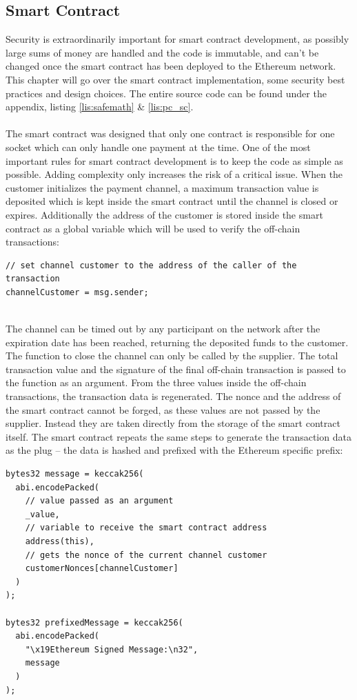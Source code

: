 \subsection{Smart Contract}
Security is extraordinarily important for smart contract development, as possibly large sums of money are handled and the code is immutable, and can’t be changed once the smart contract has been deployed to the Ethereum network.
This chapter will go over the smart contract implementation, some security best practices and design choices.
The entire source code can be found under the appendix, listing \ref{lis:safemath} \& \ref{lis:pc_sc}.
\\\\
The smart contract was designed that only one contract is responsible for one socket which can only handle one payment at the time.
One of the most important rules for smart contract development is to keep the code as simple as possible.
Adding complexity only increases the risk of a critical issue.
When the customer initializes the payment channel, a maximum transaction value is deposited which is kept inside the smart contract until the channel is closed or expires.
Additionally the address of the customer is stored inside the smart contract as a global variable which will be used to verify the off-chain transactions:
\begin{lstlisting}[language=Solidity, numbers=none]
// set channel customer to the address of the caller of the transaction
channelCustomer = msg.sender;
\end{lstlisting}
\leavevmode
\\
The channel can be timed out by any participant on the network after the expiration date has been reached, returning the deposited funds to the customer.
The function to close the channel can only be called by the supplier.
The total transaction value and the signature of the final off-chain transaction is passed to the function as an argument.
From the three values inside the off-chain transactions, the transaction data is regenerated.
The nonce and the address of the smart contract cannot be forged, as these values are not passed by the supplier.
Instead they are taken directly from the storage of the smart contract itself.
The smart contract repeats the same steps to generate the transaction data as the plug – the data is hashed and prefixed with the Ethereum specific prefix:
\\
\begin{lstlisting}[language=Solidity, numbers=none]
bytes32 message = keccak256(
  abi.encodePacked(
    // value passed as an argument
    _value,
    // variable to receive the smart contract address
    address(this),
    // gets the nonce of the current channel customer
    customerNonces[channelCustomer]
  )
);

bytes32 prefixedMessage = keccak256(
  abi.encodePacked(
    "\x19Ethereum Signed Message:\n32",
    message
  )
);
\end{lstlisting}
